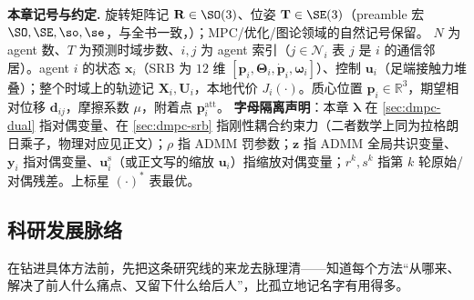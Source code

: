 \begin{note}
\textbf{本章记号与约定.}\;
旋转矩阵记 $\mathbf{R}\in\SO(3)$、位姿 $\mathbf{T}\in\SE(3)$（preamble 宏 $\SO,\SE,\so,\se$，与全书一致，）；MPC/优化/图论领域的自然记号保留。
$N$ 为 agent 数、$T$ 为预测时域步数、$i,j$ 为 agent 索引（$j\in\mathcal{N}_i$ 表 $j$ 是 $i$ 的通信邻居）。agent $i$ 的状态 $\mathbf{x}_i$（SRB 为 $12$ 维 $[\mathbf{p}_i,\boldsymbol{\Theta}_i,\dot{\mathbf{p}}_i,\boldsymbol{\omega}_i]$）、控制 $\mathbf{u}_i$（足端接触力堆叠）；整个时域上的轨迹记 $\mathbf{X}_i,\mathbf{U}_i$，本地代价 $J_i(\cdot)$。质心位置 $\mathbf{p}_i\in\mathbb{R}^3$，期望相对位移 $\mathbf{d}_{ij}$，摩擦系数 $\mu$，附着点 $\mathbf{p}_i^{\text{att}}$。
\textbf{字母隔离声明}：本章 $\boldsymbol{\lambda}$ 在 \cref{sec:dmpc-dual} 指对偶变量、在 \cref{sec:dmpc-srb} 指刚性耦合约束力（二者数学上同为拉格朗日乘子，物理对应见正文）；$\rho$ 指 ADMM 罚参数；$\mathbf{z}$ 指 ADMM 全局共识变量、$\mathbf{y}_i$ 指对偶变量、$\mathbf{u}_i^{\text{s}}$（或正文写的缩放 $\mathbf{u}_i$）指缩放对偶变量；$r^k,s^k$ 指第 $k$ 轮原始/对偶残差。上标星 $(\cdot)^*$ 表最优。
\end{note}

\subsection*{科研发展脉络}
在钻进具体方法前，先把这条研究线的来龙去脉理清——知道每个方法“从哪来、解决了前人什么痛点、又留下什么给后人”，比孤立地记名字有用得多。

